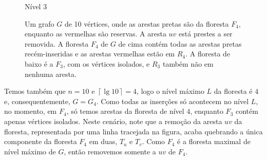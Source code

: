 \begin{figure}[H]
\begin{minipage}[c]{0.8\textwidth}
\begin{tikzpicture}
        \end{tikzpicture}
    \end{minipage}
    \vspace{1cm}
        \noindent
    \begin{minipage}[c]{2cm}
        \raggedright
        Nível $3$
    \end{minipage}%
    \begin{minipage}[c]{0.8\textwidth}
        \centering
    \end{minipage}
    \caption{Um grafo $G$ de 10 vértices, onde as arestas pretas são da floresta $F_4$, enquanto as vermelhas são reservas. A aresta $uv$ está prestes a ser removida. A floresta $F_{4}$ de $G$ de cima contém todas as arestas pretas recém-inseridas e as arestas vermelhas estão em $R_4$. A floresta de baixo é a $F_{3}$, com os vértices isolados, e $R_3$ também não em nenhuma aresta.}
    \vspace{-1cm}
    \label{fig:example-replacement1}
\end{figure}

\raggedbottom

Temos também que $n = 10$ e $\left\lceil \lg 10 \right\rceil = 4$, logo o nível máximo $L$ da floresta é $4$ e,  consequentemente, $G = G_4$. Como todas as inserções só acontecem no nível $L$, no momento, em $F_4$, só temos arestas da floresta de nível $4$, enquanto $F_3$ contém apenas vértices isolados. Neste cenário, note que a remoção da aresta $uv$ da floresta, representada por uma linha tracejada na figura, acaba quebrando a única componente da floresta $F_4$ em duas, $T_u$ e $T_v$. Como $F_4$ é a floresta maximal de nível máximo de $G$, então removemos somente a $uv$ de $F_4$. 

